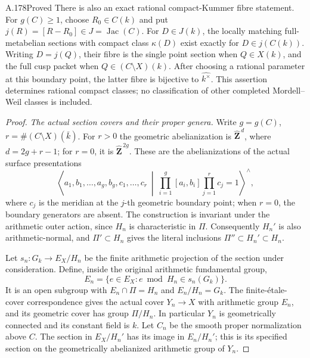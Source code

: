 \begin{statement}{A.178}{Proved}
There is also an exact rational compact-Kummer fibre statement.
For \(g(C)\ge1\), choose \(R_0\in C(k)\) and put
\(j(R)=[R-R_0]\in J=\operatorname{Jac}(C)\).
For \(D\in J(k)\), the locally matching full-metabelian sections
with compact class \(\kappa(D)\) exist exactly for
\(D\in j(C(k))\).
Writing \(D=j(Q)\), their fibre is the single point section
when \(Q\in X(k)\), and the full cusp packet when
\(Q\in(C\setminus X)(k)\).
After choosing a rational parameter at this boundary point,
the latter fibre is bijective to \(\widehat{k^\times}\).
This assertion determines rational compact classes; no
classification of other completed Mordell--Weil classes is
included.
\end{statement}

\begin{proof}
\emph{The actual section covers and their proper genera.}
Write \(g=g(C)\), \(r=\#(C\setminus X)(\bar k)\).
For \(r>0\) the geometric abelianization is
\(\widehat{\mathbf Z}^{\,d}\), where \(d=2g+r-1\);
for \(r=0\), it is \(\widehat{\mathbf Z}^{\,2g}\).
These are the abelianizations of the actual surface presentations
\[
 \left\langle a_1,b_1,\ldots,a_g,b_g,c_1,\ldots,c_r\
 \middle|\
             \prod_{i=1}^g[a_i,b_i]\prod_{j=1}^r c_j=1
 \right\rangle^{\!\wedge},
\tag{A.178.2}
\]
where \(c_j\) is the meridian at the \(j\)-th geometric boundary
point; when \(r=0\), the boundary generators are absent.
The construction is invariant under the arithmetic outer action,
since \(H_n\) is characteristic in \(\Pi\).
Consequently \(H_n'\) is also arithmetic-normal, and
\(\Pi'\subset H_n\) gives the literal inclusions
\(\Pi''\subset H_n'\subset H_n\).

Let \(s_n:G_k\to E_X/H_n\) be the finite arithmetic projection of
the section under consideration.  Define, inside the original
arithmetic fundamental group,
\[
 E_n=\{e\in E_X:e\bmod H_n\in s_n(G_k)\}.
\tag{A.178.3}
\]
It is an open subgroup with
\(E_n\cap\Pi=H_n\) and \(E_n/H_n=G_k\).
The finite-étale-cover correspondence gives the actual cover
\(Y_n\to X\) with arithmetic group \(E_n\), and its geometric
cover has group \(\Pi/H_n\).  In particular \(Y_n\) is
geometrically connected and its constant field is \(k\).
Let \(C_n\) be the smooth proper normalization above \(C\).
The section in \(E_X/H_n'\) has its image in \(E_n/H_n'\);
this is its specified section on the geometrically abelianized
arithmetic group of \(Y_n\).


\end{proof}
